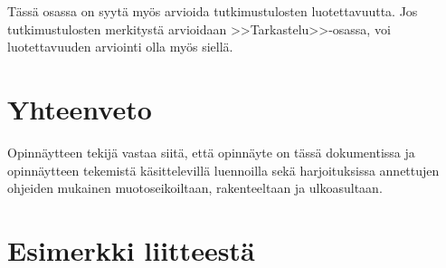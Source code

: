 \documentclass[finnish,12pt,a4paper,pdftex]{article}
\begin{document}
Tässä osassa on syytä myös arvioida tutkimustulosten luotettavuutta.
Jos tutkimustulosten merkitystä arvioidaan >>Tarkastelu>>-osassa,
voi luotettavuuden arviointi olla myös siellä. 

\clearpage

\section{Yhteenveto}

Opinnäytteen tekijä vastaa siitä, että opinnäyte on tässä dokumentissa
ja opinnäytteen tekemistä käsittelevillä luennoilla sekä
harjoituksissa annettujen ohjeiden mukainen muotoseikoiltaan,
rakenteeltaan ja ulkoasultaan.



\clearpage





\appendix 
\clearpage

\section{Esimerkki liitteestä\label{LiiteA}}
\renewcommand{\theequation}{A\arabic{equation}}
\setcounter{equation}{0}  
\renewcommand{\thefigure}{A\arabic{figure}}
\setcounter{figure}{0}
\renewcommand{\thetable}{A\arabic{table}}
\setcounter{table}{0}
\end{document}
